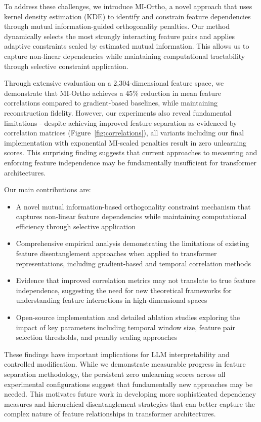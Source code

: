 \documentclass{article} %
\begin{document}
To address these challenges, we introduce MI-Ortho, a novel approach that uses kernel density estimation (KDE) to identify and constrain feature dependencies through mutual information-guided orthogonality penalties. Our method dynamically selects the most strongly interacting feature pairs and applies adaptive constraints scaled by estimated mutual information. This allows us to capture non-linear dependencies while maintaining computational tractability through selective constraint application.

Through extensive evaluation on a 2,304-dimensional feature space, we demonstrate that MI-Ortho achieves a 45\% reduction in mean feature correlations compared to gradient-based baselines, while maintaining reconstruction fidelity. However, our experiments also reveal fundamental limitations - despite achieving improved feature separation as evidenced by correlation matrices (Figure~\ref{fig:correlations}), all variants including our final implementation with exponential MI-scaled penalties result in zero unlearning scores. This surprising finding suggests that current approaches to measuring and enforcing feature independence may be fundamentally insufficient for transformer architectures.

Our main contributions are:
\begin{itemize}
    \item A novel mutual information-based orthogonality constraint mechanism that captures non-linear feature dependencies while maintaining computational efficiency through selective application
    \item Comprehensive empirical analysis demonstrating the limitations of existing feature disentanglement approaches when applied to transformer representations, including gradient-based and temporal correlation methods
    \item Evidence that improved correlation metrics may not translate to true feature independence, suggesting the need for new theoretical frameworks for understanding feature interactions in high-dimensional spaces
    \item Open-source implementation and detailed ablation studies exploring the impact of key parameters including temporal window size, feature pair selection thresholds, and penalty scaling approaches
\end{itemize}

These findings have important implications for LLM interpretability and controlled modification. While we demonstrate measurable progress in feature separation methodology, the persistent zero unlearning scores across all experimental configurations suggest that fundamentally new approaches may be needed. This motivates future work in developing more sophisticated dependency measures and hierarchical disentanglement strategies that can better capture the complex nature of feature relationships in transformer architectures.
\end{document}
